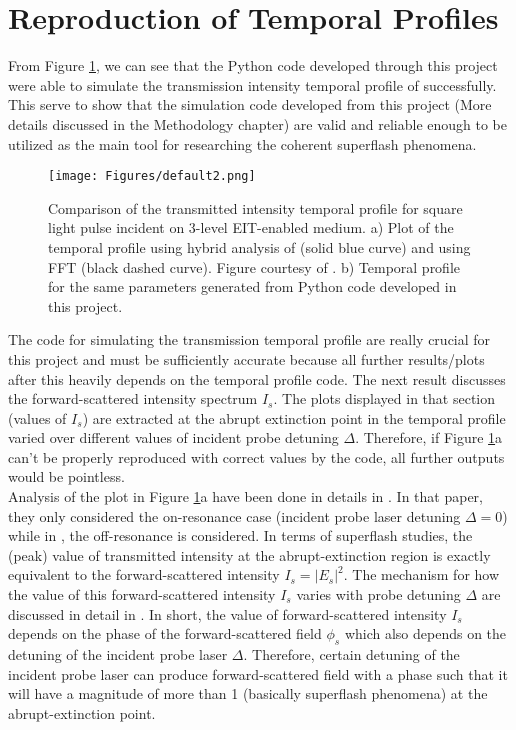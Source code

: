 \section{Reproduction of Temporal Profiles}
From Figure \ref{fig: comparing temporal profile 1}, we can see that the Python code developed through this project were able to simulate the transmission intensity temporal profile of \cite{jeong2010slow} successfully. This serve to show that the simulation code developed from this project (More details discussed in the Methodology chapter) are valid and reliable enough to be utilized as the main tool for researching the coherent superflash phenomena.

\begin{figure}[h!]
    \centering
    \texttt{[image: Figures/default2.png]}
    \caption{Comparison of the transmitted intensity temporal profile for square light pulse incident on 3-level EIT-enabled medium. a) Plot of the temporal profile using hybrid analysis of \cite{jeong2010slow} (solid blue curve) and using FFT (black dashed curve). Figure courtesy of \cite{jeong2010slow}. b) Temporal profile for the same parameters generated from Python code developed in this project.}
    \label{fig: comparing temporal profile 1}
\end{figure}

The code for simulating the transmission temporal profile are really crucial for this project and must be sufficiently accurate because all further results/plots after this heavily depends on the temporal profile code. The next result discusses the forward-scattered intensity spectrum $I_{s}$. The plots displayed in that section (values of $I_{s}$) are extracted at the abrupt extinction point in the temporal profile varied over different values of incident probe detuning $\Delta$. Therefore, if Figure \ref{fig: comparing temporal profile 1}a can't be properly reproduced with correct values by the code, all further outputs would be pointless.\\

Analysis of the plot in Figure \ref{fig: comparing temporal profile 1}a have been done in details in \cite{jeong2010slow}. In that paper, they only considered the on-resonance case (incident probe laser detuning $\Delta = 0$) while in \cite{Kwong2014}, the off-resonance is considered. In terms of superflash studies, the (peak) value of transmitted intensity at the abrupt-extinction region is exactly equivalent to the forward-scattered intensity $I_{s} = |E_{s}|^{2}$. The mechanism for how the value of this forward-scattered intensity $I_{s}$ varies with probe detuning $\Delta$ are discussed in detail in \cite{Chalony2011, Kwong2014, Kwong2017}. In short, the value of forward-scattered intensity $I_{s}$ depends on the phase of the forward-scattered field $\phi_{s}$ which also depends on the detuning of the incident probe laser $\Delta$. Therefore, certain detuning of the incident probe laser can produce forward-scattered field with a phase such that it will have a magnitude of more than 1 (basically superflash phenomena) at the abrupt-extinction point.\\

